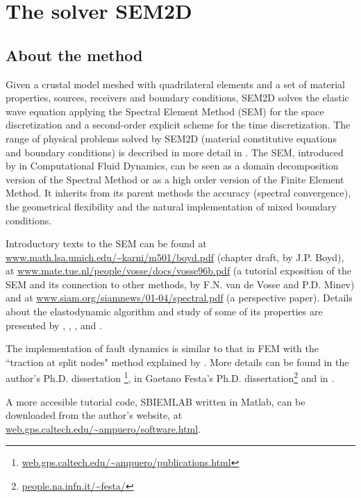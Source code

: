 \chapter{The solver SEM2D}
\label{Cha:sem2d}

\section{About the method}
\label{Sec:semethod}

Given a crustal model meshed with quadrilateral elements
and a set of material properties, sources, receivers and boundary conditions,
SEM2D solves the elastic wave equation applying 
the Spectral Element Method (SEM) for the space discretization
and a second-order explicit scheme for the time discretization.
The range of physical problems solved by SEM2D
(material constitutive equations and boundary conditions)
is described in more detail in .
The SEM, introduced by  in Computational Fluid Dynamics,
can be seen as a domain decomposition version of the Spectral Method
or as a high order version of the Finite Element Method.
It inherits from its parent methods the accuracy (spectral 
convergence), the geometrical flexibility 
and the natural implementation of mixed boundary conditions.

Introductory texts to the SEM can be found 
at \url{www.math.lsa.umich.edu/~karni/m501/boyd.pdf} 
(chapter draft, by J.P. Boyd), at
\url{www.mate.tue.nl/people/vosse/docs/vosse96b.pdf}
(a tutorial exposition of the SEM and its connection
to other methods, by F.N. van de Vosse and P.D. Minev)
and at \url{www.siam.org/siamnews/01-04/spectral.pdf} (a perspective paper).
Details about the elastodynamic algorithm and study of some of its properties
are presented by , , ,
 and .

The implementation of fault dynamics is similar to that in FEM
with the ``traction at split nodes" method explained by .
More details can be found in the author's 
Ph.D. dissertation \cite{Amp02}\footnote{
\url{web.gps.caltech.edu/~ampuero/publications.html}},
in Gaetano Festa's Ph.D. dissertation\footnote{\url{people.na.infn.it/~festa/}}
and in .

A more accesible tutorial code, SBIEMLAB written in Matlab, 
can be downloaded from the author's website, at
\url{web.gps.caltech.edu/~ampuero/software.html}.

